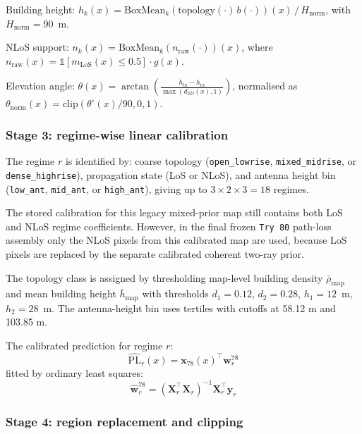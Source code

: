 Building height: $h_k(x) = \mathrm{BoxMean}_k(\mathrm{topology}(\cdot)\,b(\cdot))(x)\,/\,H_{\mathrm{norm}}$, with $H_{\mathrm{norm}} = 90$~m.

NLoS support: $n_k(x) = \mathrm{BoxMean}_k(n_{\mathrm{raw}}(\cdot))(x)$, where $n_{\mathrm{raw}}(x) = \mathbb{1}[m_{\mathrm{LoS}}(x) \le 0.5]\cdot g(x)$.

Elevation angle: $\theta(x) = \arctan\!\left(\frac{h_{\mathrm{tx}}-h_{\mathrm{rx}}}{\max(d_{2D}(x),1)}\right)$, normalised as $\theta_{\mathrm{norm}}(x) = \mathrm{clip}(\theta^\circ(x)/90, 0, 1)$.

\subsubsection{Stage 3: regime-wise linear calibration}

The regime $r$ is identified by: coarse topology (\texttt{open\_lowrise}, \texttt{mixed\_midrise}, or \texttt{dense\_highrise}), propagation state (LoS or NLoS), and antenna height bin (\texttt{low\_ant}, \texttt{mid\_ant}, or \texttt{high\_ant}), giving up to $3 \times 2 \times 3 = 18$ regimes.

The stored calibration for this legacy mixed-prior map still contains both LoS and NLoS regime coefficients. However, in the final frozen \texttt{Try 80} path-loss assembly only the NLoS pixels from this calibrated map are used, because LoS pixels are replaced by the separate calibrated coherent two-ray prior.

The topology class is assigned by thresholding map-level building density $\bar\rho_{\mathrm{map}}$ and mean building height $\bar h_{\mathrm{map}}$ with thresholds $d_1 = 0.12$, $d_2 = 0.28$, $h_1 = 12$~m, $h_2 = 28$~m. The antenna-height bin uses tertiles with cutoffs at 58.12 m and 103.85 m.

The calibrated prediction for regime $r$:
\begin{equation}
\widehat{\mathrm{PL}}_{r}(x) = \textbf{x}_{78}(x)^\top \textbf{w}^{78}_{r}
\label{eq:pl_cal}
\end{equation}
fitted by ordinary least squares:
\begin{equation}
\hat{\textbf{w}}^{78}_{r} = \left(\textbf{X}_r^\top \textbf{X}_r\right)^{-1}\textbf{X}_r^\top \textbf{y}_r
\label{eq:ols_closed}
\end{equation}

\subsubsection{Stage 4: region replacement and clipping}

